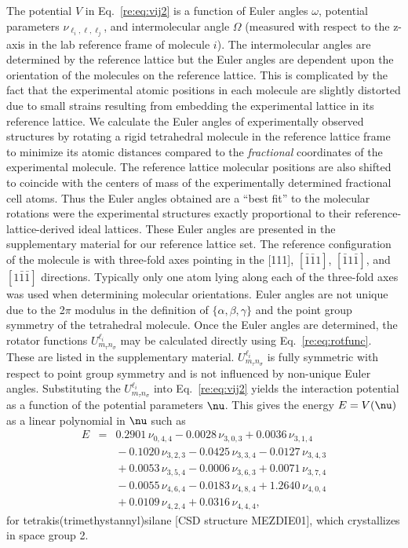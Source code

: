 \documentclass[preprint]{iucr}              %
\newcommand{\mb}[1]{\ensuremath{\mbox{\boldmath $ #1 $}}}
\begin{document}
The potential $V$ in Eq.\ \ref{re:eq:vij2} is a function of Euler
angles $\omega$, potential parameters $\nu_{\ell_i,\ell,\ell_j}$,
and intermolecular angle $\Omega$ (measured with respect to the
z-axis in the lab reference frame of molecule $i$). The
intermolecular angles are determined by the reference lattice but
the Euler angles are dependent upon the orientation of the molecules
on the reference lattice. This is complicated by the fact that the
experimental atomic positions in each molecule are slightly
distorted due to small strains resulting from embedding the
experimental lattice in its reference lattice. We calculate the
Euler angles of experimentally observed structures by rotating a
rigid tetrahedral molecule in the reference lattice frame to
minimize its atomic distances compared to the \emph{fractional}
coordinates of the experimental molecule. The reference lattice
molecular positions are also shifted to coincide with the centers of
mass of the experimentally determined fractional cell atoms. Thus
the Euler angles obtained are a ``best fit'' to the molecular
rotations were the experimental structures exactly proportional to
their reference-lattice-derived ideal lattices. These Euler angles
are presented in the supplementary material for our reference
lattice set. The reference configuration of the molecule is with
three-fold axes pointing in the [111], $[\bar{1}\bar{1}1]$,
$[\bar{1}1\bar{1}]$, and $[1\bar{1}\bar{1}]$ directions. Typically
only one atom lying along each of the three-fold axes was used when
determining molecular orientations. Euler angles are not unique due
to the 2$\pi$ modulus in the definition of $\{\alpha,\beta,\gamma\}$
and the point group symmetry of the tetrahedral molecule. Once the
Euler angles are determined, the rotator functions
$U^{\ell_i}_{m_\tau n_\sigma}$ may be calculated directly using
Eq.~\ref{re:eq:rotfunc}. These are listed in the supplementary
material. $U^{\ell_i}_{m_\tau n_\sigma}$ is fully symmetric with
respect to point group symmetry and is not influenced by non-unique
Euler angles. Substituting the $U^{\ell_i}_{m_\tau n_\sigma}$ into
Eq.~\ref{re:eq:vij2} yields the interaction potential as a function
of the potential parameters $\mb{\nu}$. This gives the energy
$E=V(\mb{\nu})$ as a linear polynomial in $\mb{\nu}$ such as
\begin{eqnarray}
\label{energyOfStructure} E & = & 0.2901\,\nu_{0,4,4} -
0.0028\,\nu_{3,0,3} +
0.0036\,\nu_{3,1,4}  \nonumber \\
&&{}- 0.1020\,\nu_{3,2,3} - 0.0425\,\nu_{3,3,4} -0.0127\,\nu_{3,4,3}
 \nonumber \\
&&{}+ 0.0053\,\nu_{3,5,4} - 0.0006\,\nu_{3,6,3} +
0.0071\,\nu_{3,7,4}  \nonumber \\
&&{}- 0.0055\,\nu_{4,6,4} - 0.0183\,\nu_{4,8,4}+
1.2640\,\nu_{4,0,4}\nonumber\\
&&{}+ 0.0109\,\nu_{4,2,4} + 0.0316\,\nu_{4,4,4},
\end{eqnarray}
for tetrakis(trimethystannyl)silane  [CSD structure MEZDIE01], which
crystallizes in space group 2.
\end{document}
